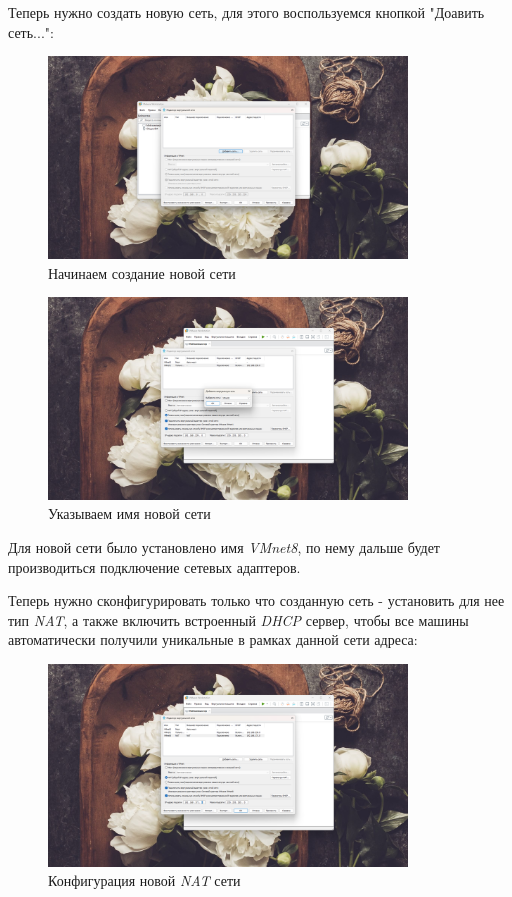 \documentclass[a4paper]{article}
\begin{document}
  Теперь нужно создать новую сеть, для этого воспользуемся кнопкой "Доавить сеть...":

  \begin{figure}[H]
    \centering
    \includegraphics[width=0.85\textwidth]{03_00 (4)}
    \caption{Начинаем создание новой сети}
    \label{img:4}
  \end{figure}

  \begin{figure}[H]
    \centering
    \includegraphics[width=0.85\textwidth]{03_01_00 (4)}
    \caption{Указываем имя новой сети}
    \label{img:5}
  \end{figure}

  Для новой сети было установлено имя \textit{VMnet8}, по нему дальше будет
  производиться подключение сетевых адаптеров.

  Теперь нужно сконфигурировать только что созданную сеть - установить для нее
  тип \textit{NAT}, а также включить встроенный \textit{DHCP} сервер, чтобы
  все машины автоматически получили уникальные в рамках данной сети адреса:

  \begin{figure}[H]
    \centering
    \includegraphics[width=0.85\textwidth]{03_01_00 (3)}
    \caption{Конфигурация новой \textit{NAT} сети}
    \label{img:6}
  \end{figure}
\end{document}
